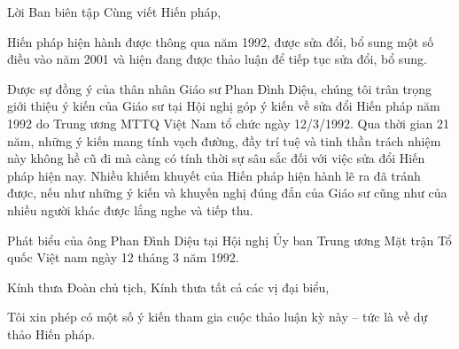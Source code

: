 Lời Ban biên tập Cùng viết Hiến pháp,

Hiến pháp hiện hành được thông qua năm 1992, được sửa đổi, bổ sung một số điều vào năm 2001 và hiện đang được thảo luận để tiếp tục sửa đổi, bổ sung.

Được sự đồng ý của thân nhân Giáo sư Phan Đình Diệu, chúng tôi trân trọng giới thiệu ý kiến của Giáo sư tại Hội nghị góp ý kiến về sửa đổi Hiến pháp năm 1992 do Trung ương MTTQ Việt Nam tổ chức ngày 12/3/1992. Qua thời gian 21 năm, những ý kiến mang tính vạch đường, đầy trí tuệ và tinh thần trách nhiệm này không hề cũ đi mà càng có tính thời sự sâu sắc đối với việc sửa đổi Hiến pháp hiện nay. Nhiều khiếm khuyết của Hiến pháp hiện hành lẽ ra đã tránh được, nếu như những ý kiến và khuyến nghị đúng đắn của Giáo sư cũng như của nhiều người khác được lắng nghe và tiếp thu.


Phát biểu của ông Phan Đình Diệu tại Hội nghị Ủy ban Trung ương Mặt trận Tổ quốc Việt nam ngày 12 tháng 3 năm 1992.

Kính thưa Đoàn chủ tịch,
Kính thưa tất cả các vị đại biểu,

Tôi xin phép có một số ý kiến tham gia cuộc thảo luận kỳ này – tức là về dự thảo Hiến pháp.

